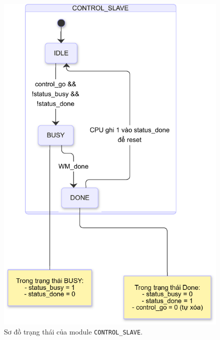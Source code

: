 \begin{figure}[htbp]
    \centering
    \includegraphics[width=0.7\linewidth]{Images/02_11_StateDiagram_ControlSlave}
    \caption{Sơ đồ trạng thái của module \texttt{CONTROL\_SLAVE}.}
    \label{fig:02_11_StateDiagram_ControlSlave}
\end{figure}

